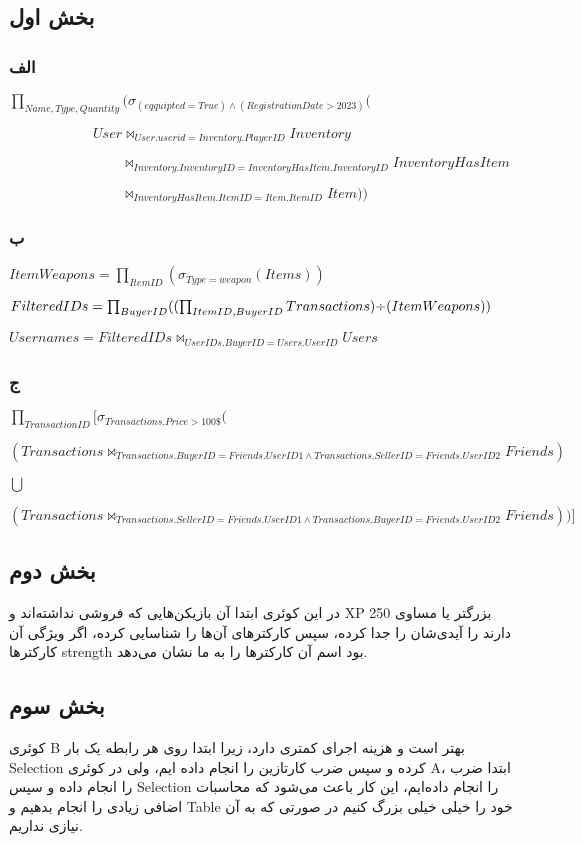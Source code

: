 \subsection*{بخش اول}

\subsubsection*{الف}

\setLTR
$\prod_{Name,Type,Quantity}(\sigma_{(eqquipted=True)\land(Registration Date > 2023)}($

 $\qquad \qquad \qquad User \bowtie_{User.userid=Inventory.PlayerID}Inventory$

 $\qquad \qquad \qquad \qquad  \bowtie_{Inventory.InventoryID = InventoryHasItem.InventoryID}InventoryHasItem$
 
 $\qquad \qquad \qquad \qquad  \bowtie_{InventoryHasItem.ItemID=Item.ItemID}Item))$
\setRTL

\subsubsection*{ب}

\setLTR
$ItemWeapons =\prod_{ItemID} (\sigma_{Type=weapon}(Items))$

$FilteredIDs = \prod_{BuyerID}((\prod_{ItemID,BuyerID}Transactions) \text{\textdiv} (ItemWeapons))$

$Usernames = FilteredIDs \bowtie_{UserIDs.BuyerID = Users.UserID} Users$
\setRTL

\subsubsection*{ج}

\setLTR
$\prod_{TransactionID}[\sigma_{Transactions.Price>100\$}($

$(Transactions\bowtie_{Transactions.BuyerID=Friends.UserID1 \land Transactions.SellerID=Friends.UserID2}Friends)$

$\bigcup$

$(Transactions\bowtie_{Transactions.SellerID=Friends.UserID1 \land Transactions.BuyerID=Friends.UserID2}Friends))]$

\setRTL
	
\subsection*{بخش دوم}

در این کوئری ابتدا آن بازیکن‌هایی که فروشی نداشته‌اند و XP بزرگتر یا مساوی 250 دارند را آیدی‌شان را جدا کرده، سپس کارکترهای آن‌ها را شناسایی کرده، اگر ویژگی آن کارکترها strength بود اسم آن‌ کارکترها را به ما نشان می‌دهد.

\subsection*{بخش سوم}

کوئری B بهتر است و هزینه اجرای کمتری دارد، زیرا ابتدا روی هر رابطه یک بار Selection کرده و سپس ضرب کارتازین را انجام داده ایم، ولی در کوئری A، ابتدا ضرب را انجام داده و سپس Selection را انجام داده‌ایم، این کار باعث می‌شود که محاسبات اضافی زیادی را انجام بدهیم و Table خود را خیلی خیلی بزرگ کنیم در صورتی که به آن نیازی نداریم. 

